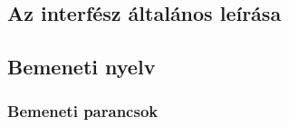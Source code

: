 \documentclass[../../projlab]{subfiles}
\begin{document}
\subsection{Az interfész általános leírása}

\subsection{Bemeneti nyelv}

\subsubsection{Bemeneti parancsok}
\end{document}
